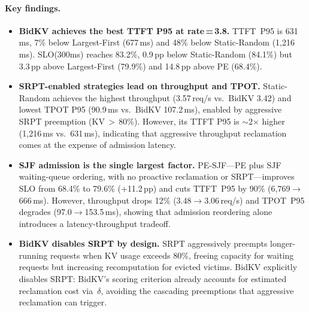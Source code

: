 \documentclass[sigconf,nonacm]{acmart}
\newcommand{\bidkv}{BidKV\xspace}
\newcommand{\qualdelta}{\ensuremath{\delta}}
\begin{document}
\paragraph{Key findings.}
\begin{itemize}[leftmargin=*,nosep]
\item \textbf{\bidkv achieves the best TTFT P95 at rate\,=\,3.8.}
  TTFT~P95 is 631\,ms, 7\% below Largest-First (677\,ms) and
  48\% below Static-Random (1{,}216\,ms).  SLO(300ms) reaches 83.2\%,
  0.9\,pp below Static-Random (84.1\%) but 3.3\,pp above Largest-First
  (79.9\%) and 14.8\,pp above PE (68.4\%).

\item \textbf{SRPT-enabled strategies lead on throughput and TPOT.}
  Static-Random achieves the highest throughput (3.57\,req/s vs.\ \bidkv
  3.42) and lowest TPOT P95 (90.9\,ms vs.\ \bidkv 107.2\,ms), enabled by
  aggressive SRPT preemption (KV\,$>$\,80\%).  However, its TTFT P95 is
  ${\sim}$2$\times$ higher (1{,}216\,ms vs.\ 631\,ms), indicating that
  aggressive throughput reclamation comes at the expense of admission latency.

\item \textbf{SJF admission is the single largest factor.}
  PE-SJF---PE plus SJF waiting-queue ordering, with no proactive reclamation
  or SRPT---improves SLO from 68.4\% to 79.6\% ($+$11.2\,pp) and cuts
  TTFT~P95 by 90\% (6{,}769$\to$666\,ms).  However, throughput drops 12\%
  (3.48$\to$3.06\,req/s) and TPOT~P95 degrades (97.0$\to$153.5\,ms),
  showing that admission reordering alone introduces a
  latency-throughput tradeoff.

\item \textbf{\bidkv disables SRPT by design.}
  SRPT aggressively preempts longer-running requests when KV usage
  exceeds 80\%, freeing capacity for waiting requests but increasing
  recomputation for evicted victims.  \bidkv explicitly disables SRPT:
  BidKV's scoring criterion already accounts for estimated reclamation cost
  via~$\qualdelta$, avoiding the cascading preemptions that aggressive
  reclamation can trigger.
\end{itemize}
\end{document}
